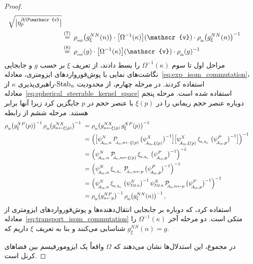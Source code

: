\begin{proof}
\begin{align}
            \ \sqrt{\big|\eta_p^{\partial\mkern-2mu/\mkern-2mu\partial\mathscr{v}}\big|} \notag \\
        \,&\overset{(7)}{=}\, \rhoout\big( g_\xi^{NN}(n) \big) \cdot \big[\Omega^{-1}(\kappa)\big](\mathscr{v}) \cdot \rhoin\big( g_\xi^{NN}(n) \big)^{-1} \notag \\
        \,&\overset{(8)}{=}\, \rhoout(g) \cdot \big[\Omega^{-1}(\kappa)\big](\mathscr{v}) \cdot \rhoin(g)^{-1}
    \end{align}
    مراحل اول تا سوم $\Omega^{-1}(\kappa)$ را بسط دادند، از تعریف $\xi$ بر حسب $g$ و جابجایی نگاشت‌های نمایی با پوش‌فورواردهای ایزومتری، معادله~\eqref{eq:exp_isom_commutation}، استفاده کردند.
    در مرحله چهارم، از محدودیت $\operatorname{Stab}_{n}$-راهبری‌پذیری $\kappa$ از معادله~\eqref{eq:spherical_steerable_kernel_space} استفاده شده است.
    مرحله پنجم دوباره عنصر حجم ریمانی را در $\xi(p)$ با عنصر حجم در $p$ جایگزین کرد زیرا آنها برابر هستند.
    مرحله ششم از رابطه
    \begin{align}
        \rhoin\big( g_\xi^{XP}(p) \big)^{-1}\, \rhoin\big( g_{n\leftarrow\xi(p)}^{NX} \big)^{-1}
        \ =&\ \rhoin\big( g_{n\leftarrow\xi(p)}^{NX}\, g_\xi^{XP}(p) \big)^{-1} \notag \\
        \ =&\ \Big( \pig[ \psiAinn^N\, \PAinnxip\, \big(\psiAinxip^X \big)^{-1} \pig] \pig[ \psiAinxip^X\, \dxiAin\, \big(\psiAinp^P \big)^{-1} \pig] \Big)^{-1} \notag \\
        \ =&\ \Big( \psiAinn^N\, \PAinnxip\, \dxiAin\, \big(\psiAinp^P \big)^{-1} \Big)^{-1} \notag \\
        \ =&\ \Big( \psiAinn^N\, \dxiAin\, \PAinnp\, \big(\psiAinp^P \big)^{-1} \Big)^{-1} \notag \\
        \ =&\ \Big( \psiAinn^N\, \dxiAin\, \big(\psiTMn^N\big)^{-1}\, \psiTMn^N\, \PAinnp\, \big(\psiAinp^P \big)^{-1} \Big)^{-1} \notag \\
        \ =&\ \rhoin\big( g_{n\leftarrow p}^{NP} \big)^{-1}\, \rhoin\big( g_\xi^{NN}(n) \big)^{-1} \,,
    \end{align}
    استفاده کرد، که دوباره بر جابجایی انتقال‌دهنده‌ها و پوش‌فورواردهای ایزومتری از معادله~\eqref{eq:transport_isom_commutation} متکی است.
    دو مرحله آخر $\Omega^{-1}(\kappa)$ را شناسایی می‌کنند و بنا به تعریف $\xi$ داریم که $g_\xi^{NN}(n) = g$.

    در مجموع، این استدلال‌ها نشان می‌دهند که $\Omega$ واقعاً یک ایزومورفیسم بین فضاهای کرنل است.
\end{proof}








